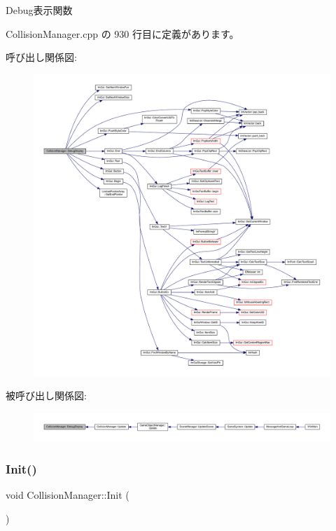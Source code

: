 Debug表示関数 



 Collision\+Manager.\+cpp の 930 行目に定義があります。

呼び出し関係図\+:\nopagebreak
\begin{figure}[H]
\begin{center}
\leavevmode
\includegraphics[width=350pt]{class_collision_manager_a4da1241f3905c3855b31d7e20ceed5a1_cgraph}
\end{center}
\end{figure}
被呼び出し関係図\+:
\nopagebreak
\begin{figure}[H]
\begin{center}
\leavevmode
\includegraphics[width=350pt]{class_collision_manager_a4da1241f3905c3855b31d7e20ceed5a1_icgraph}
\end{center}
\end{figure}
\mbox{\label{class_collision_manager_a2c5770b90b7a46a5674df008a7a57145}} 
\subsubsection{\texorpdfstring{Init()}{Init()}}
{\footnotesize\ttfamily void Collision\+Manager\+::\+Init (\begin{DoxyParamCaption}{ }\end{DoxyParamCaption})}



